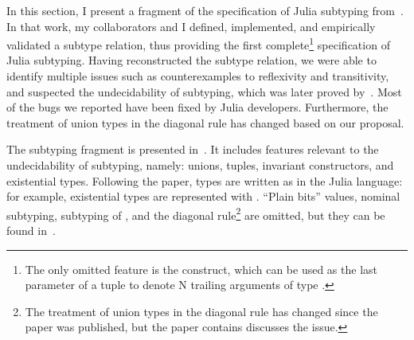 In this section, I present a fragment of the specification of Julia subtyping
from~\cite{bib:zappa-nardelli:julia-sub:oopsla:2018}.
In that work, my collaborators and I defined, implemented, and empirically
validated a subtype relation,
thus providing the first complete\footnote{The only omitted feature is the
 construct, which can be used as the last
parameter of a tuple to denote N trailing arguments of type .}
specification of Julia subtyping.
Having reconstructed the subtype relation,
we were able to identify multiple issues such as
counterexamples to reflexivity and transitivity,
and suspected the undecidability of subtyping,
which was later proved by~.
Most of the bugs we reported have been fixed by Julia developers.
Furthermore, the treatment of union types in the diagonal rule has changed
based on our proposal.

The subtyping fragment is presented in~. 
It includes features relevant to the undecidability of subtyping, namely:
unions, tuples, invariant constructors, and existential types.
Following the paper, types are written as in the Julia language:
for example, existential types are represented with .
``Plain bits'' values, nominal subtyping, 
subtyping of , and the diagonal
rule\footnote{The treatment of union types in the diagonal rule has changed
since the paper was published, but the paper contains discusses the issue.}
are omitted, but they can be found
in~\cite{bib:zappa-nardelli:julia-sub:oopsla:2018}.

